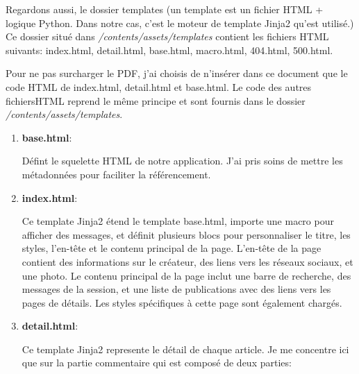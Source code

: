 \documentclass[a4paper,11pt]{article}
\begin{document}
                \noindent Regardons aussi, le dossier templates (un template est un fichier HTML + logique Python. 
                Dans notre cas, c'est le moteur de template Jinja2 qu'est utilisé.) Ce dossier situé dans \textit{/contents/assets/templates} contient 
                les fichiers HTML suivants: index.html, detail.html, base.html, macro.html, 404.html, 500.html. 

                \bigskip
                \noindent Pour ne pas surcharger le PDF, j'ai choisis de n'insérer dans ce document que le code HTML de index.html, detail.html et base.html.
                Le code des autres fichiersHTML reprend le même principe et sont fournis dans le dossier \textit{/contents/assets/templates}.

                \begin{enumerate}
                    \item \textbf{base.html}:
                        
                        \noindent Défint le squelette HTML de notre application. J'ai pris soins de mettre les métadonnées 
                        pour faciliter la référencement.

                    \item \textbf{index.html}:
                        

                        \noindent Ce template Jinja2 étend le template base.html, importe une macro pour afficher des messages, et 
                        définit plusieurs blocs pour personnaliser le titre, les styles, l'en-tête et le contenu principal de la page. 
                        L'en-tête de la page contient des informations sur le créateur, des liens vers les réseaux sociaux, et une photo. 
                        Le contenu principal de la page inclut une barre de recherche, des messages de la session, et une liste de publications avec des liens vers les pages de détails. 
                        Les styles spécifiques à cette page sont également chargés.
                    
                    \item \textbf{detail.html}:
                        
                        \noindent Ce template Jinja2 represente le détail de chaque article. Je me concentre ici 
                        que sur la partie commentaire qui est composé de deux parties:


\end{enumerate}
\end{document}
